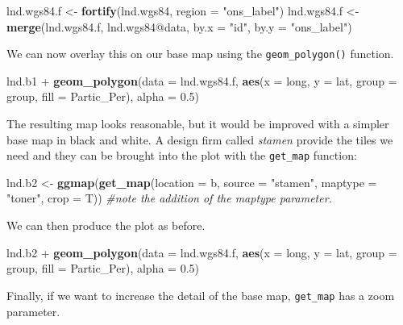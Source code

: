 \documentclass[]{article}
\newenvironment{Shaded}{}{}
\newcommand{\KeywordTok}[1]{\textcolor[rgb]{0.00,0.44,0.13}{\textbf{{#1}}}}
\newcommand{\DataTypeTok}[1]{\textcolor[rgb]{0.56,0.13,0.00}{{#1}}}
\newcommand{\FloatTok}[1]{\textcolor[rgb]{0.25,0.63,0.44}{{#1}}}
\newcommand{\StringTok}[1]{\textcolor[rgb]{0.25,0.44,0.63}{{#1}}}
\newcommand{\CommentTok}[1]{\textcolor[rgb]{0.38,0.63,0.69}{\textit{{#1}}}}
\newcommand{\NormalTok}[1]{{#1}}
\begin{document}
\begin{Shaded}
\begin{Highlighting}[]
\NormalTok{lnd.wgs84.f <- }\KeywordTok{fortify}\NormalTok{(lnd.wgs84, }\DataTypeTok{region =} \StringTok{"ons_label"}\NormalTok{)}
\NormalTok{lnd.wgs84.f <- }\KeywordTok{merge}\NormalTok{(lnd.wgs84.f, lnd.wgs84@data, }\DataTypeTok{by.x =} \StringTok{"id"}\NormalTok{, }\DataTypeTok{by.y =} \StringTok{"ons_label"}\NormalTok{)}
\end{Highlighting}
\end{Shaded}
We can now overlay this on our base map using the
\texttt{geom\_polygon()} function.

\begin{Shaded}
\begin{Highlighting}[]
\NormalTok{lnd.b1 + }\KeywordTok{geom_polygon}\NormalTok{(}\DataTypeTok{data =} \NormalTok{lnd.wgs84.f, }\KeywordTok{aes}\NormalTok{(}\DataTypeTok{x =} \NormalTok{long, }\DataTypeTok{y =} \NormalTok{lat, }\DataTypeTok{group =} \NormalTok{group, }
    \DataTypeTok{fill =} \NormalTok{Partic_Per), }\DataTypeTok{alpha =} \FloatTok{0.5}\NormalTok{)}
\end{Highlighting}
\end{Shaded}
The resulting map looks reasonable, but it would be improved with a
simpler base map in black and white. A design firm called \emph{stamen}
provide the tiles we need and they can be brought into the plot with the
\texttt{get\_map} function:

\begin{Shaded}
\begin{Highlighting}[]
\NormalTok{lnd.b2 <- }\KeywordTok{ggmap}\NormalTok{(}\KeywordTok{get_map}\NormalTok{(}\DataTypeTok{location =} \NormalTok{b, }\DataTypeTok{source =} \StringTok{"stamen"}\NormalTok{, }\DataTypeTok{maptype =} \StringTok{"toner"}\NormalTok{, }
    \DataTypeTok{crop =} \NormalTok{T))  }\CommentTok{#note the addition of the maptype parameter.}
\end{Highlighting}
\end{Shaded}
We can then produce the plot as before.

\begin{Shaded}
\begin{Highlighting}[]
\NormalTok{lnd.b2 + }\KeywordTok{geom_polygon}\NormalTok{(}\DataTypeTok{data =} \NormalTok{lnd.wgs84.f, }\KeywordTok{aes}\NormalTok{(}\DataTypeTok{x =} \NormalTok{long, }\DataTypeTok{y =} \NormalTok{lat, }\DataTypeTok{group =} \NormalTok{group, }
    \DataTypeTok{fill =} \NormalTok{Partic_Per), }\DataTypeTok{alpha =} \FloatTok{0.5}\NormalTok{)}
\end{Highlighting}
\end{Shaded}
Finally, if we want to increase the detail of the base map,
\texttt{get\_map} has a zoom parameter.
\end{document}
